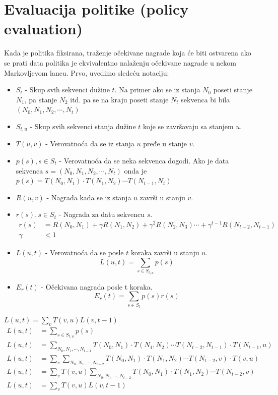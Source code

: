 \documentclass[a4paper,fleqn,12pt]{JMThesis}
\theoremstyle{plain}
\theoremstyle{definition}
\theoremstyle{definition}
\begin{document}
\section{Evaluacija politike (policy evaluation)}
Kada je politika fiksirana, traženje očekivane nagrade koja će biti ostvarena ako se prati data politika je ekvivalentno nalaženju očekivane nagrade u nekom Markovljevom lancu. Prvo, uvedimo sledeću notaciju:
\begin{itemize}
	\item $S_t$ - Skup svih sekvenci dužine $t$. Na primer ako se iz stanja $N_0$ poseti stanje $N_1$, pa stanje $N_2$ itd. pa se na kraju poseti stanje $N_t$ sekvenca bi bila $(N_0, N_1, N_2, \cdots , N_t)$
 	\item $S_{t,u}$ - Skup svih sekvenci stanja dužine $t$ koje se završavaju sa stanjem $u$.
  	\item $T(u,v)$ - Verovatnoća da se iz stanja $u$ pređe u stanje $v$.
   	\item $p(s), s \in S_t$ - Verovatnoća da se neka sekvenca dogodi. Ako je data sekvenca $s=(N_0,N_1,N_2,\cdots , N_t)$ onda je $p(s) = T(N_0, N_1)\cdot T(N_1,N_2)\cdots T(N_{t-1},N_{t})$
    \item $R(u,v)$ - Nagrada kada se iz stanja $u$ završi u stanju $v$.
    \item $r(s), s \in S_t$ - Nagrada za datu sekvencu $s$. 
    \[ 
		\begin{split}
		r(s) &= R(N_0, N_1)+\gamma R(N_1,N_2) +\gamma^2 R(N_2,N_3) \cdots + \gamma^{t-1} R(N_{t-2},N_{t-1}) \\
		\gamma &< 1
		\end{split}
	\]
    \item $L(u,t)$ - Verovatnoća da se posle $t$ koraka završi u stanju $u$. 
	\[ 
		L(u,t) = \sum_{s \in S_{t,u}}p(s)
	\]
    \item $E_r(t)$ - Očekivana nagrada posle t koraka.
    \[
		E_r(t) = \sum_{s \in S_t}p(s)r(s)
	\]
\end{itemize}
\lem $L(u,t) = \sum_{v}T(v,u)L(v,t-1)$
\[
\begin{split}
	L(u,t) &= \sum_{s \in S_{t,u}}p(s)	\\
	L(u,t) &= \sum_{N_0, N_1, \cdots, N_{t-1}}T(N_0,N_1)\cdot T(N_1,N_2)\cdots T(N_{t-2},N_{t-1})\cdot T(N_{t-1},u)\\
	L(u,t) &= \sum_{v}\sum_{N_0, N_1,\cdots , N_{t-2}}T(N_0,N_1)\cdot T(N_1,N_2)\cdots T(N_{t-2},v) \cdot T(v,u)\\
	L(u,t) &= \sum_{v}T(v,u)\sum_{N_0, N_1,\cdots , N_{t-2}}T(N_0,N_1)\cdot T(N_1,N_2)\cdots T(N_{t-2},v)\\
	L(u,t) &= \sum_{v}T(v,u)L(v,t-1)
\end{split}
\]
\end{document}
